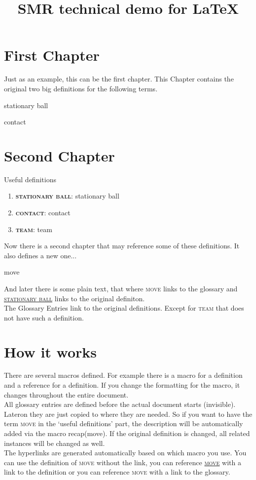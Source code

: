 \documentclass[fontsize=11pt, paper=a4]{report}
\newcommand{\refformat}[1]{{\textsc{#1}}}			 %
\newcommand{\defformat}[1]{{\textbf{\refformat{#1}}}}%
\newcommand{\dtterm}[1]{
\begin{Definition}[name=\defformat{#1}]
	\label{d:#1}
	 \glsdesc*{#1} %
\end{Definition}
}
\newcommand{\dref}[1]{\refformat{\hyperref[d:#1]{#1}}}
\newcommand{\tref}[1]{\refformat{{#1}}} %
\newcommand{\gref}[1]{\refformat{\gls{#1}}} %
\newcommand{\tterm}[1]{%
	\defformat{#1}: \glsdesc*{#1} %
}
\newcommand{\recap}[1]{\item{\tterm{#1}}}
\begin{document}
\title{SMR technical demo for \LaTeX}
\maketitle

\tableofcontents

\pagestyle{plain}%

\chapter{First Chapter}
Just as an example, this can be the first chapter. This Chapter contains the original two big definitions for the following terms.
\dtterm{stationary ball}
\dtterm{contact}

\newpage

\chapter{Second Chapter}
Useful definitions
\begin{enumerate}
	\recap{stationary ball}
	\recap{contact}
	\recap{team}
\end{enumerate}
Now there is a second chapter that may reference some of these definitions. It also defines a new one...
\dtterm{move}
 And later there is some plain text, that where \gref{move} links to the glossary and \dref{stationary ball} links to the original definiton.\\
 The Glossary Entries link to the original definitions. Except for \gref{team} that does not have such a definition.

\chapter{How it works}
There are several macros defined. For example there is a macro for a definition and a reference for a definition. If you change the formatting for the macro, it changes throughout the entire document.\\
All glossary entries are defined before the actual document starts (invisible). Lateron they are just copied to where they are needed. So if you want to have the term \tref{move} in the `useful definitions' part, the description will be automatically added via the macro recap(move). If the original definition is changed, all related instances will be changed as well.\\
The hyperlinks are generated automatically based on which macro you use. You can use the definition of \tref{move} without the link, you can reference \dref{move} with a link to the definition or you can reference \gref{move} with a link to the glossary.

\clearpage
\printglossary[title=Definitions, toctitle=List of terms]%
\end{document}

